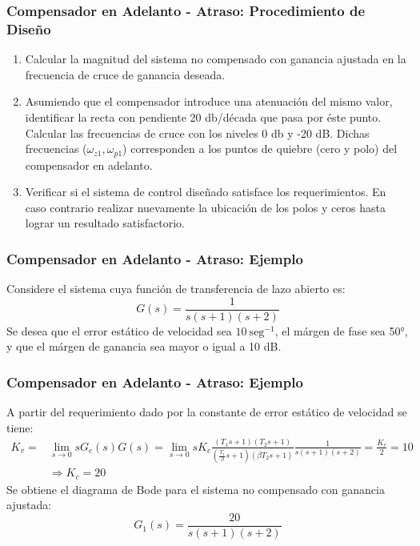 \documentclass[aspectratio=169, handout]{beamer}
\theoremstyle{definition}
\theoremstyle{plain}
\theoremstyle{remark}
\newcounter{saveenumi}
\newcommand{\conti}{\setcounter{enumi}{\value{saveenumi}}}
\begin{document}
\begin{frame}[<+->]\frametitle{Compensador en Adelanto - Atraso: Procedimiento de Diseño}
	\begin{enumerate}
		\conti
		\item Calcular la magnitud del sistema no compensado con ganancia ajustada en la frecuencia de cruce de ganancia deseada.
		\item Asumiendo que el compensador introduce una atenuación del mismo valor, identificar la recta con pendiente 20 db/década que pasa por éste punto. Calcular las frecuencias de cruce con los niveles 0 db y -20 dB. Dichas frecuencias ($\omega_{z1}, \omega_{p1}$) corresponden a los puntos de quiebre (cero y polo) del compensador en adelanto.
		\item Verificar si el sistema de control diseñado satisface los requerimientos. En caso contrario realizar nuevamente la ubicación de los polos y ceros hasta lograr un resultado satisfactorio.
	\end{enumerate}		
\end{frame}

\begin{frame}[<+->]\frametitle{Compensador en Adelanto - Atraso: Ejemplo}
	Considere el sistema cuya función de transferencia de lazo abierto es:
	\begin{equation*}
		G(s) = \frac{1}{s(s+1)(s+2)}
	\end{equation*}
	Se desea que el error estático de velocidad sea $10\ \text{seg}^{-1}$, el márgen de fase sea \ang{50}, y que el márgen de ganancia sea mayor o igual a 10 dB.
\end{frame}

\begin{frame}[<+->]\frametitle{Compensador en Adelanto - Atraso: Ejemplo}
	A partir del requerimiento dado por la constante de error estático de velocidad se tiene:
	\begin{align*}
		K_v = &\lim_{s \rightarrow 0} s G_c(s)G(s) = \lim_{s \rightarrow 0} s K_c \frac{(T_1 s + 1)(T_2 s + 1)}{(\frac{T_1}{\beta}s + 1)(\beta T_2 s + 1)} \frac{1}{s(s+1)(s+2)} = \frac{K_c}{2} = 10\\
		& \Rightarrow K_c = 20
	\end{align*}
	Se obtiene el diagrama de Bode para el sistema no compensado con ganancia ajustada:
			\begin{equation*}
				G_1(s) = \frac{20}{s(s+1)(s+2)}
			\end{equation*}
\end{frame}
\end{document}
